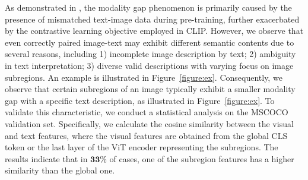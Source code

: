 As demonstrated in \cite{MindGap}, the modality gap phenomenon is primarily caused by the presence of mismatched text-image data during pre-training, further exacerbated by the contrastive learning objective employed in CLIP. However, we observe that even correctly paired image-text may exhibit different semantic contents due to several reasons, including 1) incomplete image description by text; 2) ambiguity in text interpretation; 3) diverse valid descriptions with varying focus on image subregions. An example is illustrated in Figure~\ref{figure:ex}.
Consequently, we observe that certain subregions of an image typically exhibit a smaller modality gap with a specific text description, as illustrated in Figure~\ref{figure:ex}. To validate this characteristic, we conduct a statistical analysis on the MSCOCO validation set. Specifically, we calculate the cosine similarity between the visual and text features, where the visual features are obtained from the global CLS token or the last layer of the ViT encoder representing the subregions. The results indicate that in $\mathbf{33\%}$ of cases, one of the subregion features has a higher similarity than the global one.



